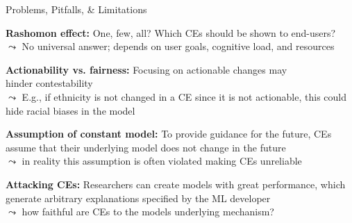 \documentclass[10pt,compress,t,notes=noshow, xcolor=table]{beamer}
\begin{document}
\begin{framei}[align=top]{Problems, Pitfalls, \& Limitations}
\item<+-> \textbf{Rashomon effect:} One, few, all? Which CEs should be shown to end-users?\\
$\leadsto$ No universal answer; depends on user goals, cognitive load, and resources
\item<+-> \textbf{Actionability vs. fairness:} Focusing on actionable changes may\\
hinder contestability\\
$\leadsto$ E.g., if ethnicity is not changed in a CE since it is not actionable, this could hide racial biases in the model
\item<+-> \textbf{Assumption of constant model:} To provide guidance for the future, CEs assume that their underlying model does not change in the future\\
$\leadsto$ in reality this assumption is often violated making CEs unreliable
\item<+-> \textbf{Attacking CEs:} Researchers can create models with great performance, which generate arbitrary explanations specified by the ML developer\\
$\leadsto$ how faithful are CEs to the models underlying mechanism?

\end{framei}
\end{document}
